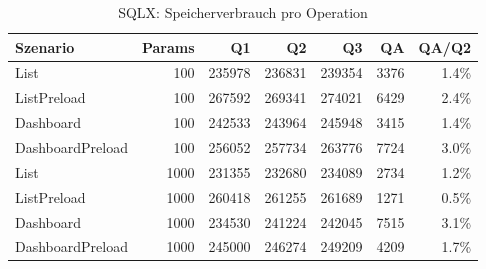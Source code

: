 \begin{table}[ht]
\centering
\caption{SQLX: Speicherverbrauch pro Operation}
\begin{tabular}{lrrrrrr}
\toprule
Szenario & Params & Q1 & Q2 & Q3 & QA & QA/Q2 \\
\midrule
		List & 100 & 235978 & 236831 & 239354 & 3376 & 1.4\% \\
		ListPreload & 100 & 267592 & 269341 & 274021 & 6429 & 2.4\% \\
		Dashboard & 100 & 242533 & 243964 & 245948 & 3415 & 1.4\% \\
		DashboardPreload & 100 & 256052 & 257734 & 263776 & 7724 & 3.0\% \\
		List & 1000 & 231355 & 232680 & 234089 & 2734 & 1.2\% \\
		ListPreload & 1000 & 260418 & 261255 & 261689 & 1271 & 0.5\% \\
		Dashboard & 1000 & 234530 & 241224 & 242045 & 7515 & 3.1\% \\
		DashboardPreload & 1000 & 245000 & 246274 & 249209 & 4209 & 1.7\% \\
\bottomrule
\end{tabular}
\label{tab:benchmark_sqlx_bytesperop}
\end{table}
	